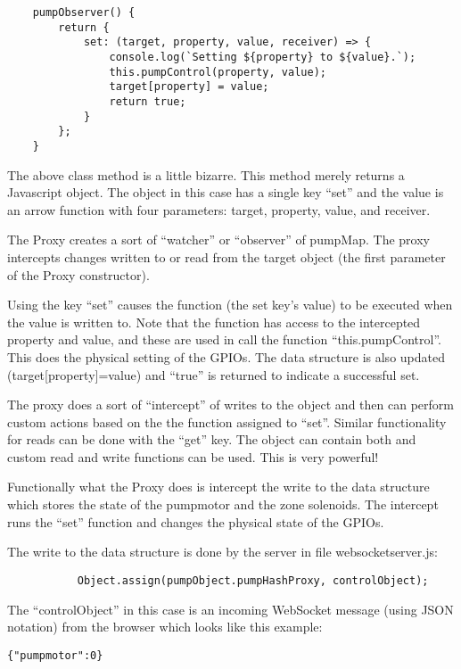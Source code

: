 \begin{verbatim}
    pumpObserver() {
        return {
            set: (target, property, value, receiver) => {
                console.log(`Setting ${property} to ${value}.`);
                this.pumpControl(property, value);
                target[property] = value;
                return true;
            }
        };
    }
\end{verbatim}

The above class method is a little bizarre.  This method merely returns a 
Javascript object.  The object in this case has a single key ``set'' and the 
value is an arrow function with four parameters: target, property, value, and 
receiver.

The Proxy creates a sort of ``watcher'' or ``observer'' of pumpMap.  The proxy 
intercepts changes written to or read from the target object (the first 
parameter of the Proxy constructor).

Using the key ``set'' causes the function (the set key's value) to be executed 
when the value is written to.  Note that the function has access to the 
intercepted property and value, and these are used in call the function 
``this.pumpControl''.  This does the physical setting of the GPIOs.  The data 
structure is also updated (target[property]=value) and ``true'' is returned to 
indicate a successful set.

The proxy does a sort of ``intercept'' of writes to the object and then can 
perform custom actions based on the the function assigned to ``set''.  Similar 
functionality for reads can be done with the ``get'' key.  The object can 
contain both and custom read and write functions can be used.  This is very 
powerful!

Functionally what the Proxy does is intercept the write to the data structure 
which stores the state of the pumpmotor and the zone solenoids.  The intercept 
runs the ``set'' function and changes the physical state of the GPIOs.

The write to the data structure is done by the server in file 
websocketserver.js:

\begin{verbatim}
           Object.assign(pumpObject.pumpHashProxy, controlObject);
\end{verbatim}

The ``controlObject'' in this case is an incoming WebSocket message (using JSON 
notation) from the browser which looks like this example:

\begin{verbatim}
{"pumpmotor":0}
\end{verbatim}

